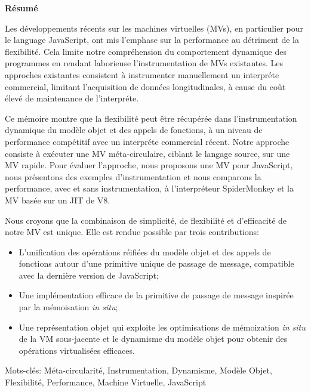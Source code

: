 
\begin{center}
\textbf{\large R\'esum\'e}
\end{center}


\vspace{1cm}
Les d\'eveloppements r\'ecents sur les machines virtuelles (MVs), en particulier
pour le language JavaScript, ont mis l'emphase sur la performance au d\'etriment
de la flexibilit\'e. Cela limite notre compr\'ehension du comportement dynamique
des programmes en rendant laborieuse l'instrumentation de MVs existantes. Les
approches existantes consistent \`a instrumenter manuellement un interpr\'ete
commercial, limitant l'acquisition de donn\'ees longitudinales, \`a cause du co\^ut
\'elev\'e de maintenance de l'interpr\'ete.
			
Ce m\'emoire montre que la flexibilit\'e peut \^etre r\'ecup\'er\'ee dans
l'instrumentation dynamique du mod\`ele objet et des appels de fonctions, \`a
un niveau de performance comp\'etitif avec un interpr\'ete commercial r\'ecent.
Notre approche consiste \`a ex\'ecuter une MV m\'eta-circulaire, ciblant le
langage source, sur une MV rapide. Pour \'evaluer l'approche, nous proposons
une MV pour JavaScript, nous pr\'esentons des exemples d'instrumentation et
nous comparons la performance, avec et sans instrumentation, \`a
l'interpr\'eteur SpiderMonkey et la MV bas\'ee sur un JIT de V8.
			
Nous croyons que la combinaison de simplicit\'e, de flexibilit\'e et d'efficacit\'e
de notre MV est unique. Elle est rendue possible par trois contributions:

\begin{itemize}
    \item L'unification des op\'erations r\'eifi\'ees du mod\`ele objet et des appels
        de fonctions autour d'une primitive unique de passage de message,
        compatible avec la derni\`ere version de JavaScript;
    \item Une impl\'ementation efficace de la primitive de passage de message
        inspir\'ee par la m\'emoisation \textit{in situ};
    \item Une repr\'esentation objet qui exploite les optimisations de
        m\'emoization \textit{in situ} de la VM sous-jacente et le dynamisme du mod\`ele
        objet pour obtenir des op\'erations virtualis\'ees efficaces.
\end{itemize}

Mots-cl\'es: M\'eta-circularit\'e, Instrumentation, Dynamisme, Mod\`ele Objet,
Flexibilit\'e, Performance, Machine Virtuelle, JavaScript  
